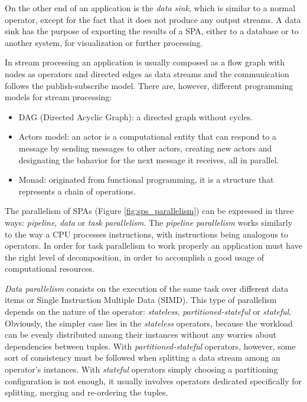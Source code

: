 \documentclass[ppgc,diss,english]{iiufrgs}
\begin{document}
On the other end of an application is the \emph{data sink}, which is similar to a normal operator, except for the fact that it does not produce any output streams. A data sink has the purpose of exporting the results of a SPA, either to a database or to another system, for visualization or further processing.


In stream processing an application is usually composed as a flow graph with nodes as operators and directed edges as data streams and the communication follows the publish-subscribe model. There are, however, different programming models for stream processing:

\begin{itemize}
\item DAG (Directed Acyclic Graph): a directed graph without cycles.
\item Actors model: an actor is a computational entity that can respond to a message by sending messages to other actors, creating new actors and designating the bahavior for the next message it receives, all in parallel.
\item Monad: originated from functional programming, it is a structure that represents a chain of operations.
\end{itemize}

The parallelism of SPAs (Figure \ref{fig:sps_parallelism}) can be expressed in three ways: \emph{pipeline}, \emph{data} or \emph{task parallelism}. The \emph{pipeline parallelism} works similarly to the way a CPU processes instructions, with instructions being analogous to operators. In order for task parallelism to work properly an application must have the right level of decomposition, in order to accomplish a good usage of computational resources.

\emph{Data parallelism} consists on the execution of the same task over different data items or Single Instruction Multiple Data (SIMD). This type of parallelism depends on the nature of the operator: \emph{stateless}, \emph{partitioned-stateful} or \emph{stateful}. Obviously, the simpler case lies in the \emph{stateless} operators, because the workload can be evenly distributed among their instances without any worries about dependencies between tuples. With \emph{partitioned-stateful} operators, however, some sort of consistency must be followed when splitting a data stream among an operator's instances. With \emph{stateful} operators simply choosing a partitioning configuration is not enough, it usually involves operators dedicated specifically for splitting, merging and re-ordering the tuples.
\end{document}
